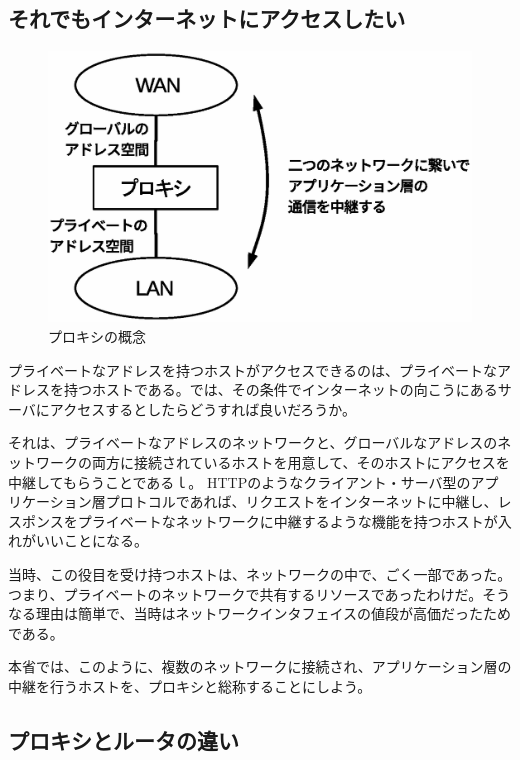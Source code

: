\subsection{それでもインターネットにアクセスしたい}

\begin{figure}[htbp]
	\includegraphics[width=12cm,clip]{draw/fig1.eps}
	\caption{プロキシの概念}
	\label{fig:proxy1}
\end{figure}

プライベートなアドレスを持つホストがアクセスできるのは、プライベートなアドレスを持つホストである。では、その条件でインターネットの向こうにあるサーバにアクセスするとしたらどうすれば良いだろうか。

それは、プライベートなアドレスのネットワークと、グローバルなアドレスのネットワークの両方に接続されているホストを用意して、そのホストにアクセスを中継してもらうことであるｌ。
HTTPのようなクライアント・サーバ型のアプリケーション層プロトコルであれば、リクエストをインターネットに中継し、レスポンスをプライベートなネットワークに中継するような機能を持つホストが入れがいいことになる。


当時、この役目を受け持つホストは、ネットワークの中で、ごく一部であった。つまり、プライベートのネットワークで共有するリソースであったわけだ。そうなる理由は簡単で、当時はネットワークインタフェイスの値段が高価だったためである。

本省では、このように、複数のネットワークに接続され、アプリケーション層の中継を行うホストを、プロキシと総称することにしよう。

\subsection{プロキシとルータの違い}


